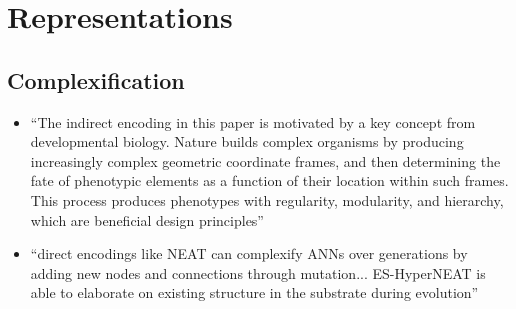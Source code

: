 

\section{Representations}

\subsection{Complexification}
  \begin{itemize}
    \item ``The indirect encoding in this paper is motivated by a key concept from developmental biology. Nature builds complex organisms by producing increasingly complex geometric coordinate frames, and then determining the fate of phenotypic elements as a function of their location within such frames. This process produces phenotypes with regularity, modularity, and hierarchy, which are beneficial design principles'' \cite{Clune2011OnRegularity}
    \item ``direct encodings like NEAT can complexify ANNs over generations by adding new nodes and connections through mutation... ES-HyperNEAT is able to elaborate on existing structure in the substrate during evolution'' \cite{Risi2010EvolvingSubstrate}
  \end{itemize}

